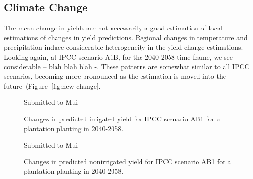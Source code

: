 \documentclass[preprint,12pt]{elsarticle}
\begin{document}

\subsection{Climate Change}
\label{sec:climate-change}


The mean change in yields are not necessarily a good estimation of
local estimations of changes in yield predictions.  Regional changes
in temperature and precipitation induce considerable heterogeneity in
the yield change estimations.  Looking again, at \ac{IPCC} scenario
A1B, for the 2040-2058 time frame, we see considerable -- blah
blah blah -.  These patterns are somewhat similar to all \ac{IPCC}
scenarios, becoming more pronounced as the estimation is moved into
the future~(Figure~\ref{fig:new-change}.

\begin{figure}[hp]
  \centering
  Submitted to Mui
  \caption{Changes in predicted irrigated yield for \ac{IPCC} scenario \ac{AB1}
    for a plantation planting in 2040-2058.}
  \label{fig:new_irrigated}
\end{figure}

\begin{figure}[hp]
  \centering
  Submitted to Mui
  \caption{Changes in predicted nonirrigated yield for \ac{IPCC} scenario \ac{AB1}
    for a plantation planting in 2040-2058.}
  \label{fig:new_nonirrigated}
\end{figure}
\end{document}

